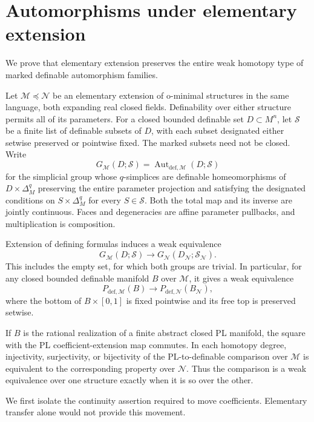 \section{Automorphisms under elementary extension}

We prove that elementary extension preserves the entire weak homotopy
type of marked definable automorphism families.

Let $\mathcal M\preccurlyeq\mathcal N$ be an elementary extension of
o-minimal structures in the same language, both expanding real closed
fields.  Definability over either structure permits all of its
parameters.  For a closed bounded definable set $D\subset M^n$, let
$\mathcal S$ be a finite list of definable subsets of $D$, with each
subset designated either setwise preserved or pointwise fixed.  The
marked subsets need not be closed.  Write
\[
 G_{\mathcal M}(D;\mathcal S)
   =\operatorname{Aut}_{\mathrm{def},\mathcal M}(D;\mathcal S)
\]
for the simplicial group whose $q$-simplices are definable
homeomorphisms of $D\times\Delta^q_M$ preserving the entire parameter
projection and satisfying the designated conditions on
$S\times\Delta^q_M$ for every $S\in\mathcal S$.  Both the total map
and its inverse are jointly continuous.  Faces and degeneracies are
affine parameter pullbacks, and multiplication is composition.

\begin{theorem}\label{thm:elementary-extension-marked-automorphisms}
Extension of defining formulas induces a weak equivalence
\[
 G_{\mathcal M}(D;\mathcal S)
 \longrightarrow
 G_{\mathcal N}(D_{\mathcal N};\mathcal S_{\mathcal N}).
\]
This includes the empty set, for which both groups are trivial.
In particular, for any closed bounded definable manifold $B$ over
$\mathcal M$, it gives a weak equivalence
\[
 P_{\mathrm{def},\mathcal M}(B)
 \longrightarrow P_{\mathrm{def},\mathcal N}(B_{\mathcal N}),
\]
where the bottom of $B\times[0,1]$ is fixed pointwise and its free
top is preserved setwise.

If $B$ is the rational realization of a finite abstract closed PL
manifold, the square with the PL
coefficient-extension map commutes.  In each homotopy degree,
injectivity, surjectivity, or bijectivity of the PL-to-definable
comparison over $\mathcal M$ is equivalent to the corresponding
property over $\mathcal N$.  Thus the comparison is a weak
equivalence over one structure exactly when it is so over the other.
\end{theorem}

We first isolate the continuity assertion required to move
coefficients.  Elementary transfer alone would not provide this
movement.

